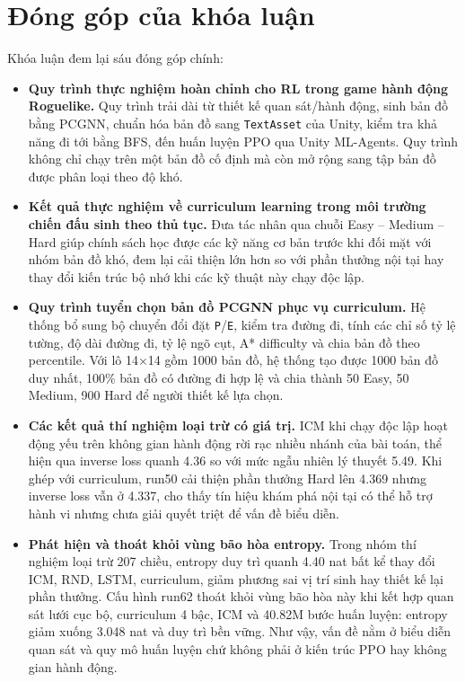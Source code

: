 \section{Đóng góp của khóa luận}

Khóa luận đem lại sáu đóng góp chính:

\begin{itemize}
    \item \textbf{Quy trình thực nghiệm hoàn chỉnh cho RL trong game hành động Roguelike.} Quy trình trải dài từ thiết kế quan sát/hành động, sinh bản đồ bằng PCGNN, chuẩn hóa bản đồ sang \texttt{TextAsset} của Unity, kiểm tra khả năng đi tới bằng BFS, đến huấn luyện PPO qua Unity ML-Agents. Quy trình không chỉ chạy trên một bản đồ cố định mà còn mở rộng sang tập bản đồ được phân loại theo độ khó.

    \item \textbf{Kết quả thực nghiệm về curriculum learning trong môi trường chiến đấu sinh theo thủ tục.} Đưa tác nhân qua chuỗi Easy -- Medium -- Hard giúp chính sách học được các kỹ năng cơ bản trước khi đối mặt với nhóm bản đồ khó, đem lại cải thiện lớn hơn so với phần thưởng nội tại hay thay đổi kiến trúc bộ nhớ khi các kỹ thuật này chạy độc lập.

    \item \textbf{Quy trình tuyển chọn bản đồ PCGNN phục vụ curriculum.} Hệ thống bổ sung bộ chuyển đổi đặt \texttt{P}/\texttt{E}, kiểm tra đường đi, tính các chỉ số tỷ lệ tường, độ dài đường đi, tỷ lệ ngõ cụt, A* difficulty và chia bản đồ theo percentile. Với lô 14$\times$14 gồm 1000 bản đồ, hệ thống tạo được 1000 bản đồ duy nhất, 100\% bản đồ có đường đi hợp lệ và chia thành 50 Easy, 50 Medium, 900 Hard để người thiết kế lựa chọn.

    \item \textbf{Các kết quả thí nghiệm loại trừ có giá trị.} ICM khi chạy độc lập hoạt động yếu trên không gian hành động rời rạc nhiều nhánh của bài toán, thể hiện qua inverse loss quanh 4.36 so với mức ngẫu nhiên lý thuyết 5.49. Khi ghép với curriculum, run50 cải thiện phần thưởng Hard lên 4.369 nhưng inverse loss vẫn ở 4.337, cho thấy tín hiệu khám phá nội tại có thể hỗ trợ hành vi nhưng chưa giải quyết triệt để vấn đề biểu diễn.

    \item \textbf{Phát hiện và thoát khỏi vùng bão hòa entropy.} Trong nhóm thí nghiệm loại trừ 207 chiều, entropy duy trì quanh 4.40 nat bất kể thay đổi ICM, RND, LSTM, curriculum, giảm phương sai vị trí sinh hay thiết kế lại phần thưởng. Cấu hình run62 thoát khỏi vùng bão hòa này khi kết hợp quan sát lưới cục bộ, curriculum 4 bậc, ICM và 40.82M bước huấn luyện: entropy giảm xuống 3.048 nat và duy trì bền vững. Như vậy, vấn đề nằm ở biểu diễn quan sát và quy mô huấn luyện chứ không phải ở kiến trúc PPO hay không gian hành động.


\end{itemize}

